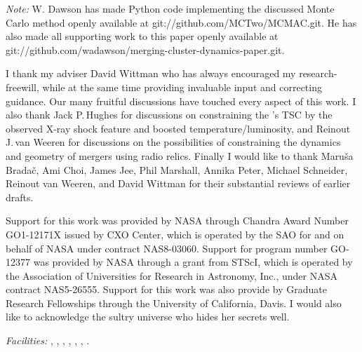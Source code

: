\documentclass[12pt]{emulateapj}
\begin{document}


\emph{Note:} W. Dawson has made Python code implementing the discussed Monte Carlo method openly available at git://github.com/MCTwo/MCMAC.git.
He has also made all supporting work to this paper openly available at 
git://github.com/wadawson/merging-cluster-dynamics-paper.git.

\acknowledgments

I thank my adviser David Wittman who has always encouraged my research-freewill, while at the same time providing invaluable input and correcting guidance.
Our many fruitful discussions have touched every aspect of this work.
I also thank Jack P.\,Hughes for discussions on constraining the 's TSC by the observed X-ray shock feature and boosted temperature/luminosity, and
Reinout J.\,van Weeren for discussions on the possibilities of constraining the dynamics and geometry of mergers using radio relics.
Finally I would like to thank Maru{\v s}a Brada{\v c}, Ami Choi, James Jee, Phil Marshall, Annika Peter, Michael Schneider, Reinout van Weeren, and David Wittman for their substantial reviews of earlier drafts.

Support for this work was provided by NASA through Chandra Award Number GO1-12171X issued by CXO Center, which is operated by the SAO for and on behalf of NASA under contract NAS8-03060.  Support for program number GO-12377 was provided by NASA through a grant from STScI, which is operated by the Association of Universities for Research in Astronomy, Inc., under NASA contract NAS5-26555.
Support for this work was also provide by Graduate Research Fellowships through the University of California, Davis.
I would also like to acknowledge the sultry universe who hides her secrets well.


{\it Facilities:} , , , , , , .

\end{document}
